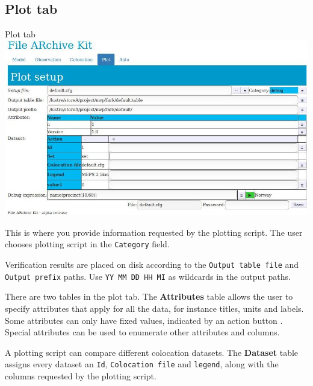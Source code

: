 \documentclass[letterpaper,10pt,twoside,twocolumn,openany]{book}
\begin{document}
\subsection{Plot tab}

\begin{paperbox}{Plot tab}
  \includegraphics[width=\columnwidth]{fark_plot.jpg}
\end{paperbox}

This is where you provide information requested by the plotting script.
The user chooses plotting script in the \lstinline!Category! field.

Verification results are placed on disk according to the \lstinline!Output table file! and \lstinline!Output prefix! paths.
Use \lstinline!YY MM DD HH MI! as wildcards in the output paths.

There are two tables in the plot tab. 
The {\bf Attributes} table allows the user to specify attributes that apply for all the data,
for instance titles, units and labels.
Some attributes can only have fixed values, indicated by an action button
 .
Special attributes can be used to enumerate other attributes and columns.

A plotting script can compare different colocation datasets.
The {\bf Dataset} table assigns every dataset an \lstinline!Id!, \lstinline!Colocation file! and 
\lstinline!legend!, along with the columns requested by the plotting script.
\end{document}
